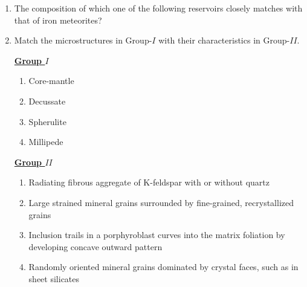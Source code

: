 \documentclass[journal,12pt,onecolumn]{IEEEtran}
\theoremstyle{remark}
\begin{document}
\begin{enumerate}
\item The composition of which one of the following reservoirs closely matches with that of iron meteorites?
\begin{enumerate}
\end{enumerate}
\hfill{}

\item Match the microstructures in Group-$I$ with their characteristics in Group-$II$.

\begin{multicols}{2}
            \underline{\textbf{Group $I$}}
            \begin{enumerate}[start =16]
                \item Core-mantle
                \item Decussate
                \item Spherulite
                \item Millipede
            \end{enumerate}

            \columnbreak

            \underline{\textbf{Group $II$}}
            \begin{enumerate}
                \item Radiating fibrous aggregate of K-feldspar with or without quartz
                \item Large strained mineral grains surrounded by fine-grained, recrystallized grains
                \item Inclusion trails in a porphyroblast curves into the matrix foliation by developing concave outward pattern
                \item Randomly oriented mineral grains dominated by crystal faces, such as in sheet silicates
            \end{enumerate}
        \end{multicols}

\begin{enumerate}
\end{enumerate}
\hfill{}


\end{enumerate}
\end{document}

